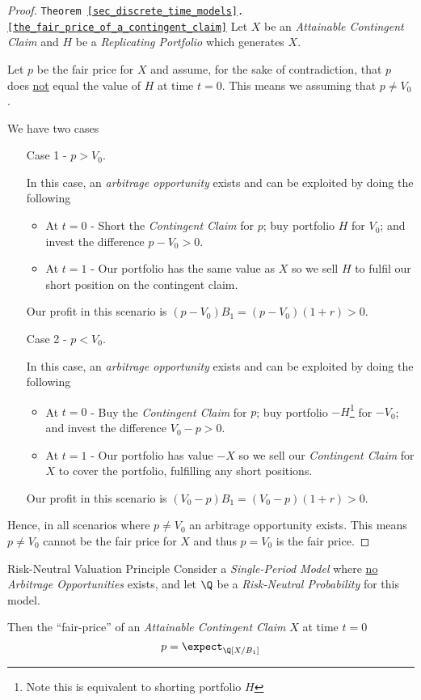 \documentclass[11pt,a4paper]{article}
\begin{document}
  \begin{proof}{\texttt{Theorem \ref{sec_discrete_time_models}.\ref{the_fair_price_of_a_contingent_claim}}}
    Let $X$ be an \textit{Attainable Contingent Claim} and $H$ be a \textit{Replicating Portfolio} which generates $X$.
    \par Let $p$ be the fair price for $X$ and assume, for the sake of contradiction, that $p$ does \underline{not} equal the value of $H$ at time $t=0$. This means we assuming that $p\neq V_0$.
    \par We have two cases
    \begin{itemize}
      \item[Case 1] - $p>V_0$.
      \par In this case, an \textit{arbitrage opportunity} exists and can be exploited by doing the following
      \begin{itemize}
        \item At $t=0$ - Short the \textit{Contingent Claim} for $p$; buy portfolio $H$ for $V_0$; and invest the difference $p-V_0>0$.
        \item At $t=1$ - Our portfolio has the same value as $X$ so we sell $H$ to fulfil our short position on the contingent claim.
      \end{itemize}
      Our profit in this scenario is $(p-V_0)B_1=(p-V_0)(1+r)>0$.
      \item[Case 2] - $p<V_0$.
      \par In this case, an \textit{arbitrage opportunity} exists and can be exploited by doing the following
      \begin{itemize}
        \item At $t=0$ - Buy the \textit{Contingent Claim} for $p$; buy portfolio $-H$\footnote{Note this is equivalent to shorting portfolio $H$} for $-V_0$; and invest the difference $V_0-p>0$.
        \item At $t=1$ - Our portfolio has value $-X$ so we sell our \textit{Contingent Claim} for $X$ to cover the portfolio, fulfilling any short positions.
      \end{itemize}
      Our profit in this scenario is $(V_0-p)B_1=(V_0-p)(1+r)>0$.
    \end{itemize}
    Hence, in all scenarios where $p\neq V_0$ an arbitrage opportunity exists.
    This means $p\neq V_0$ cannot be the fair price for $X$ and thus $p=V_0$ is the fair price.\proved
  \end{proof}

  \begin{theorem}{Risk-Neutral Valuation Principle}\label{the_risk_neutral_valuation_principle}
    Consider a \textit{Single-Period Model} where \underline{no} \textit{Arbitrage Opportunities} exists, and let $\Q$ be a \textit{Risk-Neutral Probability} for this model.
    \par Then the ``fair-price'' of an \textit{Attainable Contingent Claim} $X$ at time $t=0$
    \[ p=\expect_\Q[X/B_1] \]
  \end{theorem}
\end{document}
